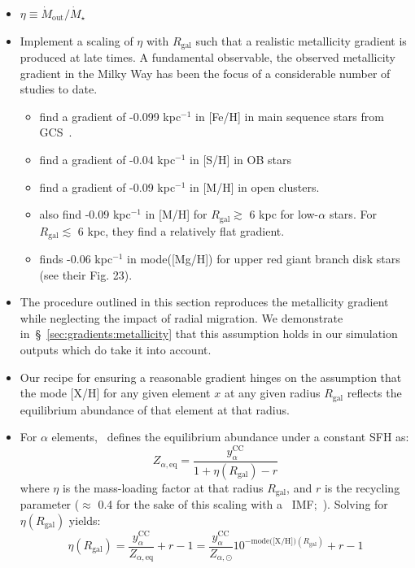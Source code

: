 \documentclass[a4paper, fleqn, usenatbib, useAMS]{mnras}
\begin{document}
\begin{itemize} 
	\item $\eta \equiv \dot{M}_\text{out}/\dot{M}_\star$ 

	\item Implement a scaling of $\eta$ with $R_\text{gal}$ such that a 
	realistic metallicity gradient is produced at late times. A fundamental 
	observable, the observed metallicity gradient in the Milky Way has been the 
	focus of a considerable number of studies to date. 
	\begin{itemize} 
		\item \citet{Nordstroem2004a} find a gradient of -0.099 kpc$^{-1}$ in 
		[Fe/H] in main sequence stars from GCS~\citep{Nordstroem2004b, 
		Holmberg2007}. 

		\item \citet{Daflon2009} find a gradient of -0.04 kpc$^{-1}$ in 
		[S/H] in OB stars 

		\item \citet{Frinchaboy2013} find a gradient of -0.09 kpc$^{-1}$ in 
		[M/H] in open clusters. 

		\item \citet{Hayden2014} also find -0.09 kpc$^{-1}$ in [M/H] for 
		$R_\text{gal}\gtrsim$ 6 kpc for low-$\alpha$ stars. For 
		$R_\text{gal}\lesssim$ 6 kpc, they find a relatively flat gradient. 

		\item \citet{Weinberg2019} finds -0.06 kpc$^{-1}$ in mode([Mg/H]) for 
		upper red giant branch disk stars (see their Fig. 23). 
	\end{itemize} 

	\item The procedure outlined in this section reproduces the metallicity 
	gradient while neglecting the impact of radial migration. We demonstrate 
	in~\S~\ref{sec:gradients:metallicity} that this assumption holds in our 
	simulation outputs which do take it into account. 

	\item Our recipe for ensuring a reasonable gradient hinges on the 
	assumption that the mode [X/H] for any given element $x$ at any given 
	radius $R_\text{gal}$ reflects the equilibrium abundance of that element at 
	that radius. 

	\item For $\alpha$ elements,~\citet{Weinberg2017} defines the equilibrium 
	abundance under a constant SFH as: 
	\begin{equation} 
	Z_{\alpha,\text{eq}} = \frac{y_\alpha^\text{CC}}{1 + \eta(R_\text{gal}) - r} 
	\end{equation} 
	where $\eta$ is the mass-loading factor at that radius $R_\text{gal}$, and 
	$r$ is the recycling parameter ($\approx$ 0.4 for the sake of this 
	scaling with a~ IMF;~\citealp{Weinberg2017}). 
	Solving for $\eta(R_\text{gal})$ yields: 
	\begin{equation} 
	\eta(R_\text{gal}) = \frac{y_\alpha^\text{CC}}{Z_{\alpha,\text{eq}}} + r - 1 
	= \frac{y_\alpha^\text{CC}}{Z_{\alpha,\odot}}10^{-\text{mode([X/H])}
	(R_\text{gal})} + r - 1 
	\end{equation} 


\end{itemize}
\end{document}
